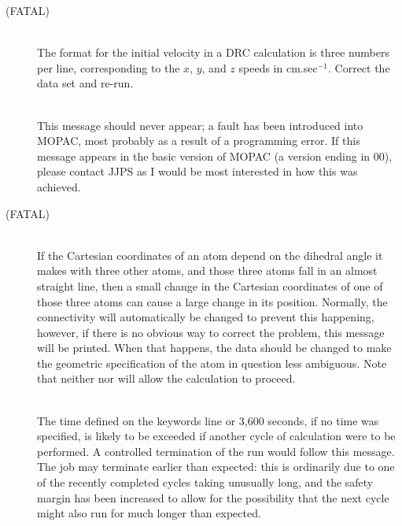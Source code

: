 \begin{description}
\item[ (FATAL)]~\\
The format for the initial velocity in a DRC calculation is three numbers
per line, corresponding to the $x$, $y$, and $z$ speeds in cm.sec$^{-1}$.
Correct the data set and re-run.
 
\item[]~\\
This message should never appear; a fault has been introduced  into MOPAC, 
most  probably  as  a  result  of  a programming error.  If this message
appears in the basic version of MOPAC  (a  version  ending  in 00),  please 
contact JJPS as I would be most interested in how this was achieved.
 

\item[ (FATAL)]~\\
If the Cartesian coordinates of an  atom  depend  on  the  dihedral angle  it
makes with three other atoms, and those three atoms fall in an almost straight
line, then a small change in the  Cartesian  coordinates of  one  of  those
three atoms can cause a large change in its position. Normally, the
connectivity will automatically be changed to prevent this  happening, however,
if there is no obvious way to correct the problem, this message will be
printed.  When that happens, the data  should be changed to make the geometric
specification of the atom in  question less ambiguous. Note that neither 
  nor   will allow the calculation to proceed.


\item[]~\\
The time defined on the keywords line or 3,600 seconds, if no  time was 
specified, is likely to be exceeded if another cycle of calculation were to be
performed.  A controlled termination of the run would  follow this  message.  
The  job  may terminate earlier than expected:  this is ordinarily due to one
of the recently completed cycles taking  unusually long,  and  the  safety 
margin  has  been  increased  to  allow for the possibility that the next cycle
might also  run  for  much  longer  than expected.
 

\end{description}
